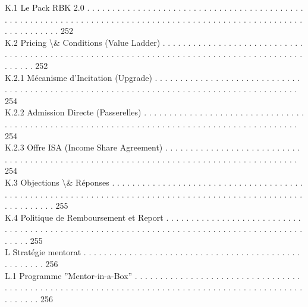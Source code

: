 K.1     Le Pack RBK 2.0 . . . . . . . . . . . . . . . . . . . . . . . . . . . . . . . . . . . . . . . . . . . . . . . . . . . . . . . . . . . . . . . . . . . . . . . . . . . . . . . . . . . . . . . . . . . . . . . . . . . . . . . . . . . . . . . . . 252\\
K.2     Pricing \textbackslash{}& Conditions (Value Ladder) . . . . . . . . . . . . . . . . . . . . . . . . . . . . . . . . . . . . . . . . . . . . . . . . . . . . . . . . . . . . . . . . . . . . . . . . . . . . . . . . . . . . . . . . . . . . . 252\\
K.2.1               Mécanisme d’Incitation (Upgrade) . . . . . . . . . . . . . . . . . . . . . . . . . . . . . . . . . . . . . . . . . . . . . . . . . . . . . . . . . . . . . . . . . . . . . . . . . . . . . . . . . . . . . . . 254\\
K.2.2               Admission Directe (Passerelles) . . . . . . . . . . . . . . . . . . . . . . . . . . . . . . . . . . . . . . . . . . . . . . . . . . . . . . . . . . . . . . . . . . . . . . . . . . . . . . . . . . . . . . . . . . 254\\
K.2.3               Offre ISA (Income Share Agreement) . . . . . . . . . . . . . . . . . . . . . . . . . . . . . . . . . . . . . . . . . . . . . . . . . . . . . . . . . . . . . . . . . . . . . . . . . . . . . . . . . . . . . 254\\
K.3     Objections \textbackslash{}& Réponses . . . . . . . . . . . . . . . . . . . . . . . . . . . . . . . . . . . . . . . . . . . . . . . . . . . . . . . . . . . . . . . . . . . . . . . . . . . . . . . . . . . . . . . . . . . . . . . . . . . . . . . . . . . 255\\
K.4     Politique de Remboursement et Report . . . . . . . . . . . . . . . . . . . . . . . . . . . . . . . . . . . . . . . . . . . . . . . . . . . . . . . . . . . . . . . . . . . . . . . . . . . . . . . . . . . . . . . . . . . 255\\
\vspace{0.5em}
L     Stratégie mentorat . . . . . . . . . . . . . . . . . . . . . . . . . . . . . . . . . . . . . . . . . . . . . . . . . . . 256\\
L.1     Programme ”Mentor-in-a-Box” . . . . . . . . . . . . . . . . . . . . . . . . . . . . . . . . . . . . . . . . . . . . . . . . . . . . . . . . . . . . . . . . . . . . . . . . . . . . . . . . . . . . . . . . . . . . . . . . . . . 256\\
\vspace{0.5em}
\vspace{0.5em}
